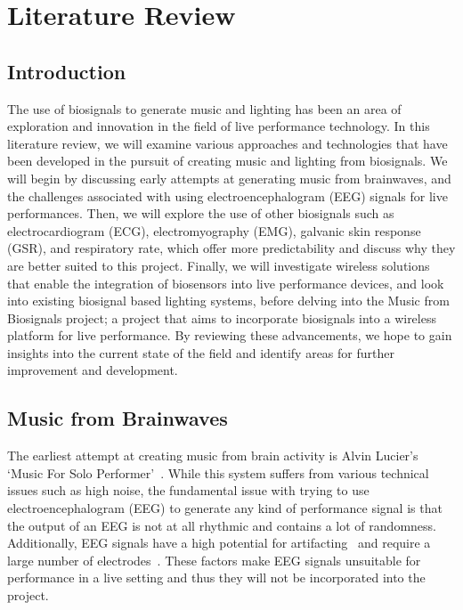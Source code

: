 \section{Literature Review}
\subsection{Introduction}
The use of biosignals to generate music and lighting has been an area of exploration and innovation in the field of live performance technology.
In this literature review, we will examine various approaches and technologies that have been developed in the pursuit of creating music and lighting from biosignals.
We will begin by discussing early attempts at generating music from brainwaves,
and the challenges associated with using electroencephalogram (EEG) signals for live performances.
Then, we will explore the use of other biosignals such as electrocardiogram (ECG), electromyography (EMG), galvanic skin response (GSR), and respiratory rate,
which offer more predictability and discuss why they are better suited to this project.
Finally, we will investigate wireless solutions that enable the integration of biosensors into live performance devices,
and look into existing biosignal based lighting systems, before delving into the Music from Biosignals project;
a project that aims to incorporate biosignals into a wireless platform for live performance.
By reviewing these advancements, we hope to gain insights into the current state of the field and identify areas for further improvement and development.


\subsection{Music from Brainwaves}
The earliest attempt at creating music from brain activity is Alvin Lucier's `Music For Solo Performer'~\cite{Lucier:2010}\cite{Straebel:2014}.
While this system suffers from various technical issues such as high noise,
the fundamental issue with trying to use electroencephalogram (EEG) to generate any kind of performance signal
is that the output of an EEG is not at all rhythmic and contains a lot of randomness.
Additionally, EEG signals have a high potential for artifacting~\cite{Mannan:2018} and require a large number of electrodes~\cite{Piorecky:2019}.
These factors make EEG signals unsuitable for performance in a live setting and thus they will not be incorporated into the project.

